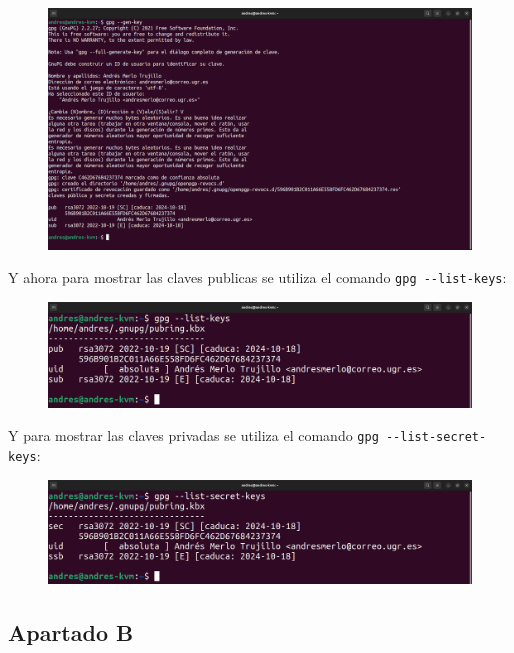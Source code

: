 \documentclass{article}
\begin{document}
\begin{figure}[H]
    \includegraphics[width=\textwidth]{imagenes/Captura desde 2022-10-19 16-48-19.png}
\end{figure}

Y ahora para mostrar las claves publicas se utiliza el comando \verb|gpg --list-keys|:

\begin{figure}[H]
    \includegraphics[width=\textwidth]{imagenes/Captura desde 2022-10-19 16-55-18.png}
\end{figure}

Y para mostrar las claves privadas se utiliza el comando \verb|gpg --list-secret-keys|:

\begin{figure}[H]
    \includegraphics[width=\textwidth]{imagenes/Captura desde 2022-10-19 16-55-26.png}
\end{figure}

\subsection*{Apartado B}
\end{document}
